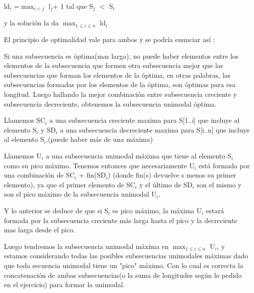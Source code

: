 ld$_i$ =$\max_{i<j}$ l$_j$+ 1  tal que S$_j$ $<$ S$_i$ 

y la solución la da $\max_{1\leq i\leq n}$ ld$_i$


El principio de optimalidad vale para ambos y se podría enunciar así : 

Si una subsecuencia es óptima(mas larga), no puede haber elementos entre los elementos de la subsecuencia que formen otra subsecuencia mejor que las subsecuencias que forman los elementos de la óptima, en otras palabras, las subsecuencias formadas por los elementos de la óptima, son óptimas para esa longitud.
Luego hallando la mejor combinación entre subsecuencia creciente y subsecuencia decreciente, obtenemos la subsecuencia unimodal óptima. 


Llamemos SC${_i}$ a una subsecuencia creciente maxima para S[1..i] que incluye al elemento S$_i$ y SD${_i}$ a una subsecuencia decreciente maxima para S[i..n] que incluye al elemento S${_i}$.(puede haber más de una máxima)

Llamemos U${_i}$ a una subsecuencia unimodal máxima que tiene al elemento S${_i}$ como su pico máximo.
Tenemos entonces que necesariamente U${_i}$ está formada por una combinación de SC${_i}$ + fin(SD${_i}$) (donde fin(s) devuelve s menos su primer elemento), ya que el primer elemento de SC${_i}$ y el último de SD${_i}$ son el mismo y son el pico máximo de la subsecuencia unimodal U${_i}$.

Y lo anterior se deduce de que si S{$_i$} es pico máximo, la máxima U${_i}$ estará formada por la subsecuencia creciente más larga hasta el pico y la decreciente mas larga desde el pico. 

Luego tendremos la subsecuencia unimodal máxima en $\max_{1\leq i\leq n}$ U${_i}$, y estamos considerando todas las posibles subsecuencias unimodales máximas dado que toda secuencia unimodal tiene un "pico" máximo.
Con lo cual es correcta la concatenación de ambas subsecuencias(o la suma de longitudes según lo pedido en el ejercicio) para formar la unimodal. 
